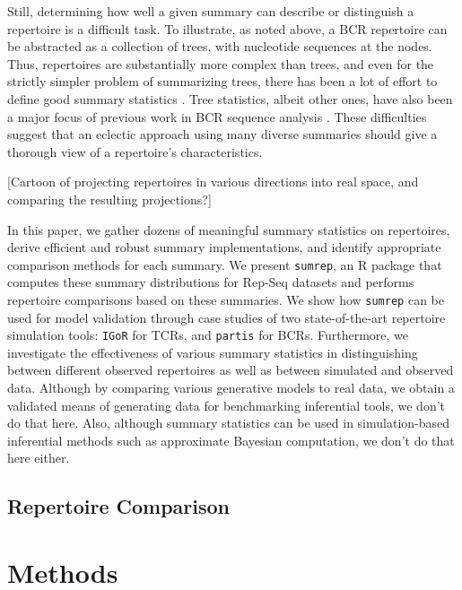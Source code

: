\documentclass{article}
\begin{document}
Still, determining how well a given summary can describe or distinguish a repertoire is a difficult task.
To illustrate, as noted above, a BCR repertoire can be abstracted as a collection of trees, with nucleotide sequences at the nodes.
Thus, repertoires are substantially more complex than trees, and even for the strictly simpler problem of summarizing trees, there has been a lot of effort to define good summary statistics \cite{Mooers1997-jl}.
Tree statistics, albeit other ones, have also been a major focus of previous work in BCR sequence analysis \cite{Dunn-Walters2004-hv,Mehr2004-ej,Steiman-Shimony2006-fm,Shahaf2008-cc}.
These difficulties suggest that an eclectic approach using many diverse summaries should give a thorough view of a repertoire's characteristics.

[Cartoon of projecting repertoires in various directions into real space, and comparing the resulting projections?]

In this paper, we gather dozens of meaningful summary statistics on repertoires, derive efficient and robust summary implementations, and identify appropriate comparison methods for each summary.
We present \texttt{sumrep}, an R package that computes these summary distributions for Rep-Seq datasets and performs repertoire comparisons based on these summaries.
We show how \texttt{sumrep} can be used for model validation through case studies of two state-of-the-art repertoire simulation tools: \texttt{IGoR} \cite{Marcou2018-du} for TCRs, and \texttt{partis} \cite{Ralph2016-nw, Ralph2016-iz} for BCRs.
Furthermore, we investigate the effectiveness of various summary statistics in distinguishing between different observed repertoires as well as between simulated and observed data.
Although by comparing various generative models to real data, we obtain a validated means of generating data for benchmarking inferential tools, we don't do that here.
Also, although summary statistics can be used in simulation-based inferential methods such as approximate Bayesian computation, we don't do that here either.

\subsection*{Repertoire Comparison}


\section*{Methods}
\end{document}

